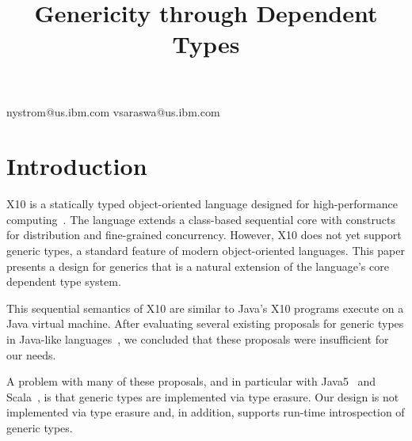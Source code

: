 \documentclass{llncs}
\newif\iflncs
\begin{document}
\title{Genericity through Dependent Types}

\iflncs

\author{Nathaniel Nystom\inst{1} \and Vijay Saraswat\inst{1}}

\institute{IBM T.~J. Watson Research~Center, P.O.~Box~704, Yorktown~Heights NY 10598 USA,
\email{\{nystrom,vsaraswa\}@us.ibm.com}}

\else

  {nystrom@us.ibm.com}
  {vsaraswa@us.ibm.com}


\fi

\maketitle


\section{Introduction}

X10 is a statically typed object-oriented language
designed for high-performance computing~\cite{X10}. The language extends a
class-based sequential core with constructs for distribution and
fine-grained concurrency.  However, X10 does not yet support
generic types, a standard feature of modern object-oriented languages.
This paper presents a design for generics that is a natural
extension of the language's core dependent type system.

This sequential semantics of X10 are similar to Java's
X10 programs execute on a Java virtual machine.  
After evaluating several existing proposals for generic types in
Java-like
languages~\cite{Java3,adding-wildcards,GJ,Pizza,polyj,thorup97,allen03,allen04,csharp,emir06,scala},
we concluded that these proposals were insufficient for our needs.

A problem with many of these proposals, and in particular with
Java5~\cite{Java3} and Scala~\cite{scala}, is that generic types 
are implemented via type erasure.
Our design is not implemented via type erasure and, in addition,
supports run-time introspection of generic types.
\end{document}

